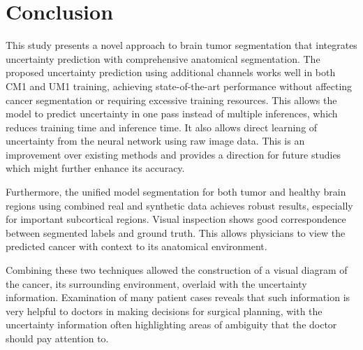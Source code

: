 \documentclass[11pt,letterpaper]{article}
\begin{document}
\section{Conclusion}
This study presents a novel approach to brain tumor segmentation that integrates uncertainty prediction with comprehensive anatomical segmentation. The proposed uncertainty prediction using additional channels works well in both CM1 and UM1 training, achieving state-of-the-art performance without affecting cancer segmentation or requiring excessive training resources. This allows the model to predict uncertainty in one pass instead of multiple inferences, which reduces training time and inference time. It also allows direct learning of uncertainty from the neural network using raw image data. This is an improvement over existing methods and provides a direction for future studies which might further enhance its accuracy.

Furthermore, the unified model segmentation for both tumor and healthy brain regions using combined real and synthetic data achieves robust results, especially for important subcortical regions. Visual inspection shows good correspondence between segmented labels and ground truth. This allows physicians to view the predicted cancer with context to its anatomical environment.

Combining these two techniques allowed the construction of a visual diagram of the cancer, its surrounding environment, overlaid with the uncertainty information. Examination of many patient cases reveals that such information is very helpful to doctors in making decisions for surgical planning, with the uncertainty information often highlighting areas of ambiguity that the doctor should pay attention to.


\newpage
\appendix
\end{document}
